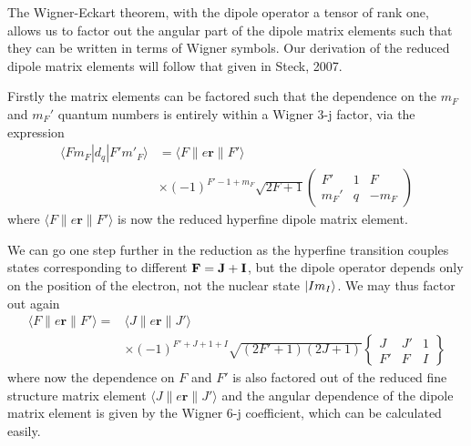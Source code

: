    The Wigner-Eckart theorem\cite{wigner1959group,RevModPhys.2.305}, with the
    dipole operator a tensor of rank one, allows us to factor out the angular
    part of the dipole matrix elements such that they can be written in terms of
    Wigner symbols. Our derivation of the reduced dipole matrix elements will
    follow that given in Steck, 2007.\cite{Steck2007}

    Firstly the matrix elements can be factored such that the dependence on the
    $m_F$ and $m_F'$ quantum numbers is entirely within a Wigner 3-j factor, via
    the expression
    \begin{align}
      \langle F m_F | d_q | F' m'_F \rangle &= 
      \langle F  \| e \mathbf{r} \| F' \rangle \nonumber \\
      &\times (-1)^{F' - 1 + m_F} \sqrt{2F + 1}
      \begin{pmatrix}
        F' & 1 & F \\
        m_F' & q & -m_F 
      \end{pmatrix}
      \label{eqn:red_hf_tdme}
    \end{align}
    where $\langle F  \| e \mathbf{r} \| F' \rangle$ is now the reduced
    hyperfine dipole matrix element.

    We can go one step further in the reduction as the hyperfine transition
    couples states corresponding to different $\bf{F} = \bf{J} + \bf{I}$, but
    the dipole operator depends only on the position of the electron, not the
    nuclear state $\Ket{I m_I}$. We may thus factor out again
    \begin{align}
      \langle F  \| e \mathbf{r} \| F' \rangle =
      &\langle J  \| e \mathbf{r} \| J' \rangle \nonumber \\
      &\times (-1)^{F' + J + 1 + I}
      \sqrt{(2F' + 1)(2J + 1)}
            \begin{Bmatrix}
        J & J' & 1 \\
        F' & F & I 
      \end{Bmatrix}
      \label{eqn:red_tdme}
    \end{align}
    where now the dependence on $F$ and $F'$ is also factored out of the reduced
    fine structure matrix element $\langle J  \| e \mathbf{r} \| J' \rangle$ and
    the angular dependence of the dipole matrix element is given by the Wigner
    6-j coefficient, which can be calculated easily.


